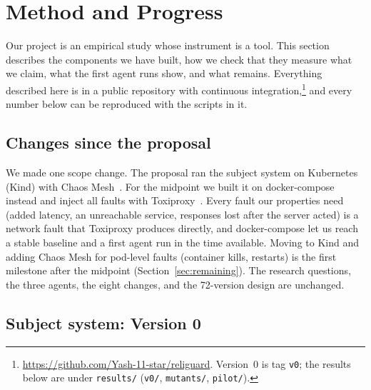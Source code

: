 
\section{Method and Progress}
\label{sec:method}

Our project is an empirical study whose instrument is a tool. This section describes the
components we have built, how we check that they measure what we claim, what the first agent
runs show, and what remains. Everything described here is in a public repository with
continuous integration,\footnote{\url{https://github.com/Yash-11-star/religuard}. Version~0 is tag
\texttt{v0}; the results below are under \texttt{results/} (\texttt{v0/}, \texttt{mutants/},
\texttt{pilot/}).} and every number below can be reproduced with the scripts in it.

\subsection{Changes since the proposal}
\label{sec:scope}

We made one scope change. The proposal ran the subject system on Kubernetes (Kind) with
Chaos Mesh~\cite{chaosmesh}. For the midpoint we built it on docker-compose instead and inject
all faults with Toxiproxy~\cite{toxiproxy}. Every fault our properties need (added latency,
an unreachable service, responses lost after the server acted) is a network fault that Toxiproxy
produces directly, and docker-compose let us reach a stable baseline and a first agent run in
the time available. Moving to Kind and adding Chaos Mesh for pod-level faults (container kills,
restarts) is the first milestone after the midpoint (Section~\ref{sec:remaining}). The research
questions, the three agents, the eight changes, and the 72-version design are unchanged.

\subsection{Subject system: Version 0}
\label{sec:v0}

